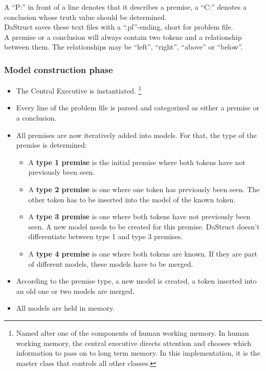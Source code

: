 \documentclass[hidelinks]{scrartcl}
\begin{document}
A ``P:'' in front of a line denotes that it describes a premise, a ``C:'' denotes a conclusion whose truth value should be determined. \\
DaStruct saves these text files with a ``.pf''-ending, short for problem file. \\
A premise or a conclusion will always contain two tokens and a relationship between them. The relationships may be ``left'', ``right'', ``above'' or ``below''.

\subsubsection{Model construction phase}
\begin{itemize}
\item The Central Executive is instantiated. \footnote{Named after one of the components of human \gls{working memory}. In human \gls{working memory}, the central executive directs attention and chooses which information to pass on to long term memory. In this implementation, it is the master class that controls all other classes.}
\item Every line of the problem file is parsed and categorized as either a premise or a conclusion.
\item All premises are now iteratively added into models. For that, the type of the premise is determined:
	\begin{itemize}
	\item A \textbf{type 1 premise} is the initial premise where both tokens have not previously been seen.
	\item A \textbf{type 2 premise} is one where one token has previously been seen. The other token has to be inserted into the model of the known token.
	\item A \textbf{type 3 premise} is one where both tokens have not previously been seen. A new model needs to be created for this premise. DaStruct doesn't differentiate between type 1 and type 3 premises.
	\item A \textbf{type 4 premise} is one where both tokens are known. If they are part of different models, these models have to be merged.
	\end{itemize}
\item According to the premise type, a new model is created, a token inserted into an old one or two models are merged. 
\item All models are held in memory.
\end{itemize}
\end{document}

